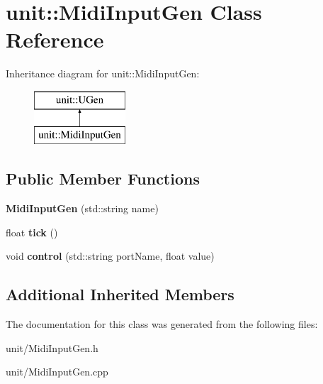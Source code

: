 \hypertarget{classunit_1_1MidiInputGen}{}\section{unit\+:\+:Midi\+Input\+Gen Class Reference}
\label{classunit_1_1MidiInputGen}
Inheritance diagram for unit\+:\+:Midi\+Input\+Gen\+:\begin{figure}[H]
\begin{center}
\leavevmode
\includegraphics[height=2.000000cm]{classunit_1_1MidiInputGen}
\end{center}
\end{figure}
\subsection*{Public Member Functions}
\begin{DoxyCompactItemize}
\item 
{\bfseries Midi\+Input\+Gen} (std\+::string name)\hypertarget{classunit_1_1MidiInputGen_a48063ea203958867e649466152ccebd8}{}\label{classunit_1_1MidiInputGen_a48063ea203958867e649466152ccebd8}

\item 
float {\bfseries tick} ()\hypertarget{classunit_1_1MidiInputGen_a4633d43acd7810f80ebc3ac343ba7dd3}{}\label{classunit_1_1MidiInputGen_a4633d43acd7810f80ebc3ac343ba7dd3}

\item 
void {\bfseries control} (std\+::string port\+Name, float value)\hypertarget{classunit_1_1MidiInputGen_a97db1d2b3deac8d7dd09fce65bfdca04}{}\label{classunit_1_1MidiInputGen_a97db1d2b3deac8d7dd09fce65bfdca04}

\end{DoxyCompactItemize}
\subsection*{Additional Inherited Members}


The documentation for this class was generated from the following files\+:\begin{DoxyCompactItemize}
\item 
unit/Midi\+Input\+Gen.\+h\item 
unit/Midi\+Input\+Gen.\+cpp\end{DoxyCompactItemize}
